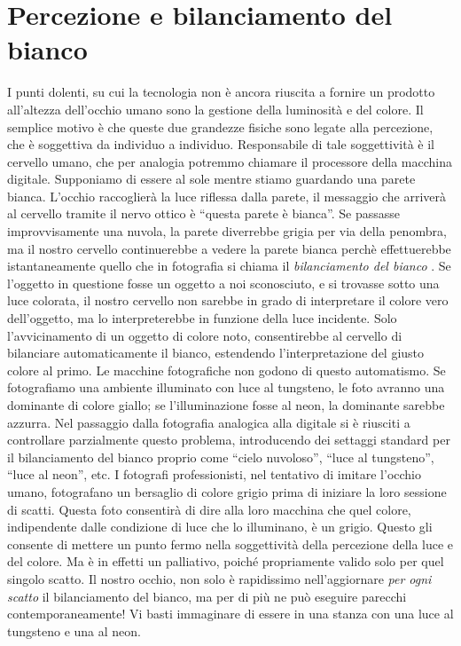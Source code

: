 \section*{Percezione e bilanciamento del bianco}
I punti dolenti, su cui la tecnologia non è ancora riuscita a fornire un prodotto all'altezza dell'occhio umano sono la gestione della luminosità e del colore. Il semplice motivo è che queste due grandezze fisiche sono legate alla percezione, che è soggettiva da individuo a individuo. Responsabile di tale soggettività è il cervello umano, che per analogia potremmo chiamare il processore della macchina digitale. 
Supponiamo di essere al sole mentre stiamo guardando una parete bianca. L'occhio raccoglierà la luce riflessa dalla parete, il messaggio che arriverà al cervello tramite il nervo ottico è ``questa parete è bianca''.  Se passasse improvvisamente una nuvola, la parete diverrebbe grigia per via della penombra, ma il nostro cervello continuerebbe a vedere la parete bianca perchè effettuerebbe istantaneamente quello che in fotografia si chiama il \emph{bilanciamento del bianco} \cite{freeman}. Se l'oggetto in questione fosse un oggetto a noi sconosciuto, e si trovasse sotto una luce colorata, il nostro cervello non sarebbe  in grado di interpretare il colore vero dell'oggetto, ma lo interpreterebbe in funzione della luce incidente. Solo l'avvicinamento di un oggetto di colore noto, consentirebbe al cervello di bilanciare automaticamente il bianco, estendendo l'interpretazione del giusto colore al primo.
Le macchine fotografiche non godono di questo automatismo. Se fotografiamo una ambiente illuminato con luce al tungsteno, le foto avranno una dominante di colore giallo; se l'illuminazione fosse al neon, la dominante sarebbe azzurra. Nel passaggio dalla fotografia analogica alla digitale si è riusciti a controllare parzialmente questo problema, introducendo dei settaggi standard per il bilanciamento del bianco proprio come ``cielo nuvoloso'', ``luce al tungsteno'', ``luce al neon'', etc. I fotografi professionisti, nel tentativo di imitare l'occhio umano, fotografano un bersaglio di colore grigio prima di iniziare la loro sessione di scatti. Questa foto consentirà di dire alla loro macchina che quel colore, indipendente dalle condizione di luce che lo illuminano, è un grigio. Questo gli consente di mettere un punto fermo nella soggettività della percezione della luce e del colore. Ma è in effetti un palliativo, poiché propriamente valido solo per quel singolo scatto. Il nostro occhio, non solo è rapidissimo nell'aggiornare \emph{per ogni scatto} il bilanciamento del bianco, ma per di più ne può eseguire parecchi contemporaneamente! Vi basti immaginare di essere in una stanza con una luce al tungsteno e una al neon.

